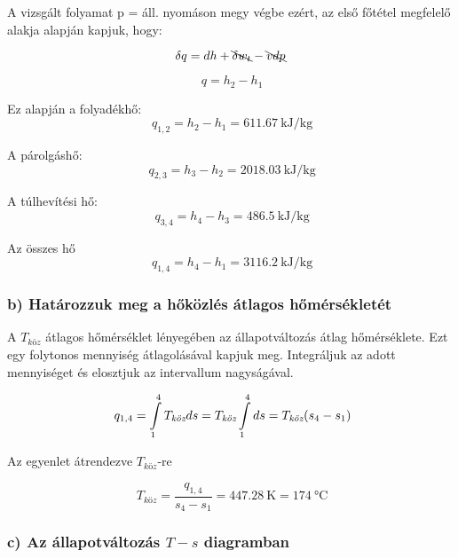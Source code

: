 A vizsgált folyamat p = áll. nyomáson megy végbe ezért, az első főtétel megfelelő alakja alapján kapjuk, hogy:

\begin{equation}
\delta q = dh + \bcancel{\delta w_t}-\bcancel{vdp}
\end{equation}

\begin{equation}
\ q = h_2-h_1
\end{equation}

Ez alapján a folyadékhő:
\begin{equation}
\ q_{1,2} = h_2-h_1 = \SI{611,67}{\kilo\joule\per\kilogram}
\end{equation}

A párolgáshő:
\begin{equation}
\ q_{2,3} = h_3-h_2 = \SI{2018,03}{\kilo\joule\per\kilogram}
\end{equation}

A túlhevítési hő:
\begin{equation}
\ q_{3,4} = h_4-h_3 = \SI{486,5}{\kilo\joule\per\kilogram}
\end{equation}

Az összes hő
\begin{equation}
\ q_{1,4} = h_4-h_1 = \SI{3116,2}{\kilo\joule\per\kilogram}
\end{equation}

\subsubsection*{b) Határozzuk meg a hőközlés átlagos hőmérsékletét}

A $T_{\textit{köz}}$ átlagos hőmérséklet lényegében az állapotváltozás átlag hőmérséklete. Ezt egy folytonos mennyiség átlagolásával kapjuk meg. Integráljuk az adott mennyiséget és elosztjuk az intervallum nagyságával. 

\begin{equation*}
\ q_{1,4} = \int\displaylimits_{1}^{4} T_{\textit{köz}} ds = T_{\textit{köz}} \int\displaylimits_{1}^{4} ds = T_{\textit{köz}} (s_4-s_1)
\end{equation*}

Az egyenlet átrendezve $T_{\textit{köz}}$-re

\begin{equation}
\ T_{\textit{köz}} = \frac{q_{1,4}}{s_4-s_1} = \SI{447,28}{\kelvin} = \SI{174}{\celsius}
\end{equation}

\subsubsection*{c) Az állapotváltozás $T-s$ diagramban}

